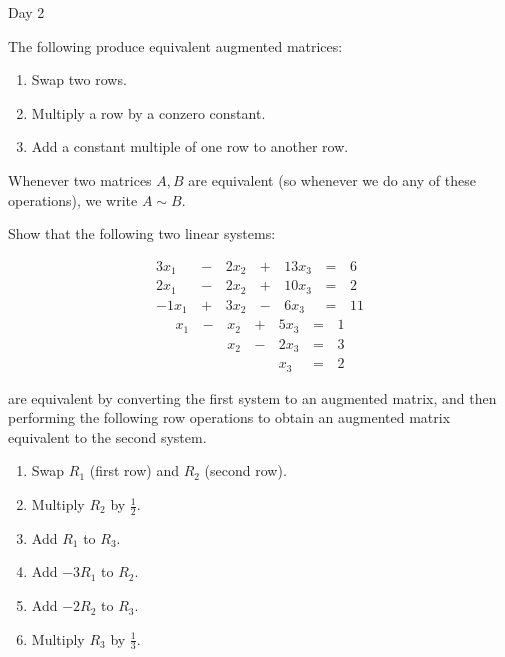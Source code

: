 
\begin{applicationActivities}{Day 2}

\begin{definition}
  The following  produce equivalent
  augmented matrices:
  \begin{enumerate}
    \item Swap two rows.
    \item Multiply a row by a conzero constant.
    \item Add a constant multiple of one row to another row.
  \end{enumerate}
  Whenever two matrices \(A,B\) are equivalent (so whenever we do any of
  these operations), we write \(A\sim B\).
\end{definition}

\begin{activity}{15}
  Show that the following two linear systems:
  \begin{multicols}{2}\noindent
    \begin{alignat*}{4}
      3x_1 &\,-\,& 2x_2 &\,+\,& 13x_3 &\,=\,& 6 \\
      2x_1 &\,-\,& 2x_2 &\,+\,& 10x_3 &\,=\,& 2 \\
     -1x_1 &\,+\,& 3x_2 &\,-\,&  6x_3 &\,=\,& 11
    \end{alignat*}
    \begin{alignat*}{4}
       x_1 &\,-\,&  x_2  &\,+\,&  5x_3 &\,=\,& 1 \\
           &\, \,&  x_2 &\,-\,&  2x_3 &\,=\,& 3 \\
           &\, \,&      &\, \,&   x_3 &\,=\,& 2
    \end{alignat*}
  \end{multicols}
  are equivalent by converting the first system to an augmented matrix,
  and then performing the following row operations to obtain
  an augmented matrix equivalent to the second system.
  \begin{multicols}{2}\noindent
  \begin{enumerate}
    \item Swap \(R_1\) (first row) and \(R_2\) (second row).
    \item Multiply \(R_2\) by \(\frac{1}{2}\).
    \item Add \(R_1\) to \(R_3\).
    \item Add \(-3R_1\) to \(R_2\).
    \item Add \(-2R_2\) to \(R_3\).
    \item Multiply \(R_3\) by \(\frac{1}{3}\).
  \end{enumerate}
  \end{multicols}
\end{activity}


\end{applicationActivities}
